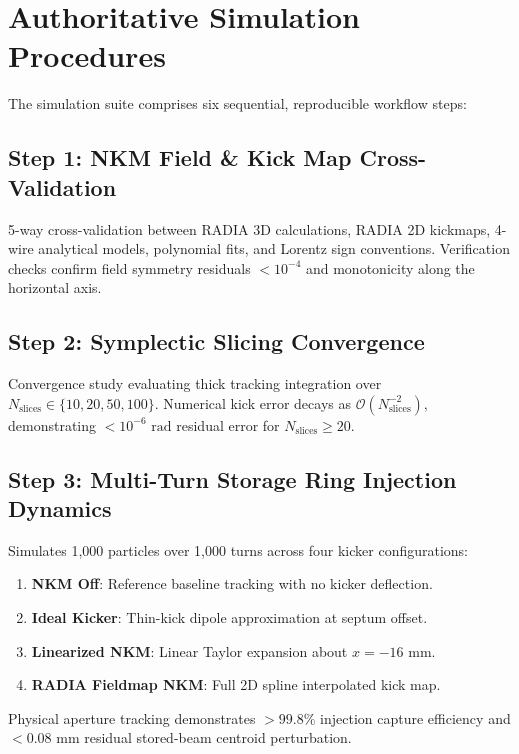 \documentclass[11pt,a4paper]{article}
\begin{document}
\section{Authoritative Simulation Procedures}

The simulation suite comprises six sequential, reproducible workflow steps:

\subsection{Step 1: NKM Field \& Kick Map Cross-Validation}
5-way cross-validation between RADIA 3D calculations, RADIA 2D kickmaps, 4-wire analytical models, polynomial fits, and Lorentz sign conventions. Verification checks confirm field symmetry residuals $< 10^{-4}$ and monotonicity along the horizontal axis.

\subsection{Step 2: Symplectic Slicing Convergence}
Convergence study evaluating thick tracking integration over $N_{\text{slices}} \in \{10, 20, 50, 100\}$. Numerical kick error decays as $\mathcal{O}(N_{\text{slices}}^{-2})$, demonstrating $< 10^{-6}\text{ rad}$ residual error for $N_{\text{slices}} \ge 20$.

\subsection{Step 3: Multi-Turn Storage Ring Injection Dynamics}
Simulates 1,000 particles over 1,000 turns across four kicker configurations:
\begin{enumerate}
    \item \textbf{NKM Off}: Reference baseline tracking with no kicker deflection.
    \item \textbf{Ideal Kicker}: Thin-kick dipole approximation at septum offset.
    \item \textbf{Linearized NKM}: Linear Taylor expansion about $x = -16\text{ mm}$.
    \item \textbf{RADIA Fieldmap NKM}: Full 2D spline interpolated kick map.
\end{enumerate}

Physical aperture tracking demonstrates $> 99.8\%$ injection capture efficiency and $< 0.08\text{ mm}$ residual stored-beam centroid perturbation.
\end{document}
